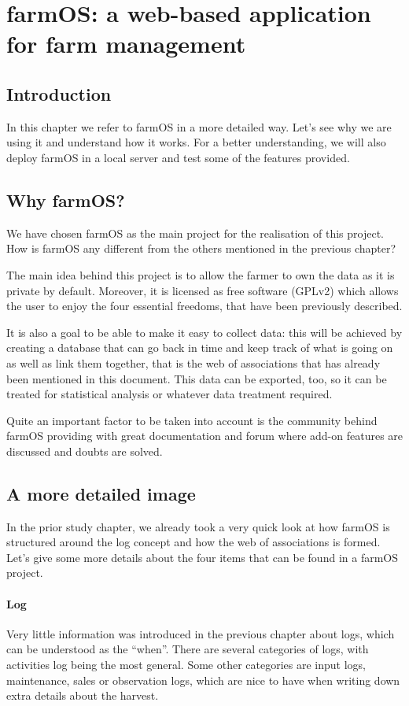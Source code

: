 \chapter{farmOS: a web-based application for farm management}\label{cap:diseño}

\section{Introduction}
In this chapter we refer to farmOS in a more detailed way. Let's see why we are using it and understand how it works. For a better understanding, we will also deploy farmOS in a local server and test some of the features provided.  

\section{Why farmOS?}
We have chosen farmOS as the main project for the realisation of this project. How is farmOS any different from the others mentioned in the previous chapter? 

The main idea behind this project is to allow the farmer to own the data as it is private by default. Moreover, it is licensed as free software (GPLv2) which allows the user to enjoy the four essential freedoms, that have been previously described.

It is also a goal to be able to make it easy to collect data: this will be achieved by creating a database that can go back in time and keep track of what is going on as well as link them together, that is the web of associations that has already been mentioned in this document. This data can be exported, too, so it can be treated for statistical analysis or whatever data treatment required.

Quite an important factor to be taken into account is the community behind farmOS providing with great documentation and forum where add-on features are discussed and doubts are solved.

\section{A more detailed image}
In the prior study chapter, we already took a very quick look at how farmOS is structured around the log concept and how the web of associations is formed. Let's give some more details about the four items that can be found in a farmOS project.

\subsubsection{Log}
Very little information was introduced in the previous chapter about logs, which can be understood as the ``when''. There are several categories of logs, with activities log being the most general. Some other categories are input logs, maintenance, sales or observation logs, which are nice to have when writing down extra details about the harvest.

